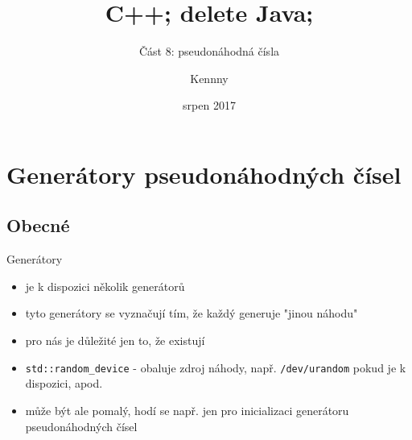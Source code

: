 \documentclass{beamer}
\begin{document}
\title{C++; delete Java;}
\subtitle{Část 8: pseudonáhodná čísla}
\author{Kennny}
\date{srpen 2017}

\frame{\titlepage}


\newenvironment{xframe}[1][]
  {\begin{frame}[fragile,environment=xframe,#1]}
  {\end{frame}}

\begin{comment}
\begin{xframe}{tttt}
	\begin{itemize}
		\item
	\end{itemize}
\end{xframe}
\end{comment}



\section{Generátory pseudonáhodných čísel}
\subsection{Obecné}



\begin{xframe}{Generátory}
	\begin{itemize}
		\item je k dispozici několik generátorů
		\item tyto generátory se vyznačují tím, že každý generuje "jinou náhodu"
		\item pro nás je důležité jen to, že existují
		\item \texttt{std::random\_device} - obaluje zdroj náhody, např. \texttt{/dev/urandom} pokud je k dispozici, apod.
		\item může být ale pomalý, hodí se např. jen pro inicializaci generátoru pseudonáhodných čísel
	\end{itemize}
\end{xframe}
\end{document}

